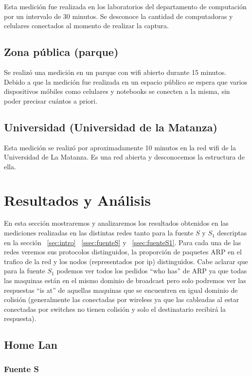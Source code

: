 \documentclass[final,inline,narroweqnarray,a4paper]{ieee}
\begin{document}
Esta medición fue realizada en los laboratorios del departamento de computación por un intervalo de 30 minutos. Se desconoce la cantidad de computadoras y celulares conectados al momento de realizar la captura.

\subsection{Zona pública (parque)}
Se realizó una medición en un parque con wifi abierto durante 15 minutos. Debido a que la medición fue realizada en un espacio público se espera que varios dispositivos móbiles como celulares y notebooks se conecten a la misma, sin poder precisar cuántos a priori.

\subsection{Universidad (Universidad de la Matanza)}
Esta medición se realizó por aproximadamente 10 minutos en la red wifi de la Universidad de La Matanza. Es una red abierta y desconocemos la estructura de ella.

\section{Resultados y Análisis}
En esta sección mostraremos y analizaremos los resultados obtenidos en las mediciones realizadas en las distintas redes tanto para la fuente $S$ y $S_1$ descriptas en la sección ~\ref{sec:intro} ~\ref{ssec:fuenteS} y ~\ref{ssec:fuenteS1}. Para cada una de las redes veremos sus protocolos distinguidos, la proporción de paquetes ARP en el trafico de la red y los nodos (representados por ip) distinguidos. Cabe aclarar que para la fuente $S_1$ podemos ver todos los pedidos ``who has'' de ARP ya que todas las maquinas están en el mismo dominio de broadcast pero solo podremos ver las respuestas ``is at'' de aquellas maquinas que se encuentren en igual dominio de colisión (generalmente las conectadas por wireless ya que las cableadas al estar conectadas por switches no tienen colisión y solo el destinatario recibirá la respuesta). 


\subsection{Home Lan}
\subsubsection{Fuente S}
\end{document}
